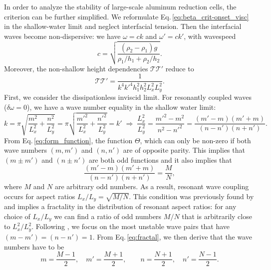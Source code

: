 \documentclass[aps,prfluids,reprint,superscriptaddress]{revtex4-2}
\begin{document}
In order to analyze the stability of large-scale aluminum reduction cells, the criterion can be further simplified. We reformulate Eq.\,\eqref{eq:beta_crit-onset_visc} in the shallow-water limit and neglect interfacial tension. Then the interfacial waves become non-dispersive: we have $\omega = ck$ and $\omega' = ck'$, with wavespeed
\begin{equation}
	c = \sqrt{ \frac{(\rho_2 - \rho_1)g}{\rho_1/h_1 + \rho_2/h_2 } } .
	\label{eq:wave-speed}
\end{equation}
Moreover, the non-shallow height dependencies $\mathcal{T}\mathcal{T'}$ reduce to 
\begin{equation}
	\mathcal{T}\mathcal{T'} = \frac{1}{k^4k'^4h_1^2h_2^2L_x^2L_y^2}.
\end{equation}
First, we consider the dissipationless inviscid limit. For resonantly coupled waves ($\delta\omega=0$), we have a wave number equality in the shallow water limit:
\begin{equation}
	k = \pi\sqrt{\frac{m^2}{L_x^2} + \frac{n^2}{L_y^2}} = \pi\sqrt{\frac{m'^2}{L_x^2} + \frac{n'^2}{L_y^2}} = k' 
	\; \Longrightarrow \;  \frac{L_x^2}{L_y^2} = \frac{m'^2 - m^2}{n^2 - n'^2} = \frac{(m'-m)(m'+m)}{(n-n')(n+n')}.
	\label{eq:wave_number_equality}
\end{equation}
From Eq.\,\eqref{eq:form_function}, the function $\Theta$, which can only be non-zero if both wave numbers $(m,m')$ and $(n,n')$ are of opposite parity. This implies that $(m\pm m')$ and $(n\pm n')$ are both odd functions and it also implies that
\begin{equation}
	\frac{(m'-m)(m'+m)}{(n-n')(n+n')} = \frac{M}{N}, \label{eq:fractal}
\end{equation} 
where $M$ and $N$ are arbitrary odd numbers. As a result, resonant wave coupling occurs for aspect ratios $L_x/L_y = \sqrt{M/N}$. This condition was previously found by \citet{Politis2021} and implies a fractality in the distribution of resonant aspect ratios: for any choice of $L_x/L_y$ we can find a ratio of odd numbers $M/N$ that is arbitrarily close to $L_x^2 /L_y^2$. Following \cite{Politis2021}, we focus on the most unstable wave pairs that have $(m-m')= (n-n') = 1$. From Eq.\,\eqref{eq:fractal}, we then derive that the wave numbers have to be
\begin{equation}
	m = \frac{M-1}{2}, \quad m' = \frac{M + 1}{2}, \qquad
	n = \frac{N +1}{2}, \quad n' = \frac{N - 1}{2}	.
	\label{eq:mn_odd}
\end{equation}
\end{document}
